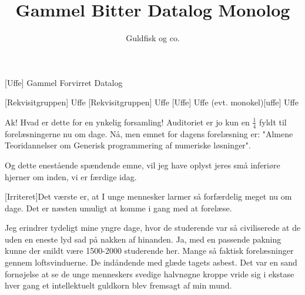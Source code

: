\documentclass[a4paper,11pt]{article}
\title{Gammel Bitter Datalog Monolog}
\author{Guldfisk og co.}
\begin{document}
\maketitle

\begin{roles}
[Uffe] Gammel Forvirret Datalog
\end{roles}

\begin{props}
[Rekvisitgruppen] Uffe
[Rekvisitgruppen] Uffe
[Uffe] Uffe
\prop(evt. monokel)[uffe] Uffe

\end{props}

  
\begin{sketch}


%  
 
 
 
Ak! Hvad er dette for en ynkelig forsamling! Auditoriet er
jo kun en $\frac14$ fyldt til forelæsningerne nu om dage. Nå, men emnet for dagens
forelæsning er: "Almene Teoridannelser om Generisk programmering af numeriske løsninger".

Og dette enestående spændende emne, vil jeg have oplyst jeres små
inferiøre hjerner om inden, vi er færdige idag.

[Irriteret]Det værste er, at I unge mennesker larmer så
forfærdelig meget nu om dage. Det er næsten umuligt at komme i gang med at
forelæse. 

 Jeg erindrer tydeligt mine yngre dage, hvor de studerende
var så civiliserede at de uden en eneste lyd sad på nakken af hinanden. Ja,
med en passende pakning kunne der snildt være 1500-2000 studerende
her. Mange så faktisk forelæsninger gennem loftsvinduerne. De
indåndende med glæde tagets asbest. Det
var en sand fornøjelse at se de unge menneskers svedige halvnøgne
kroppe vride sig i ekstase hver gang et intellektuelt
guldkorn blev fremsagt af min mund. 


\end{sketch}
\end{document}
